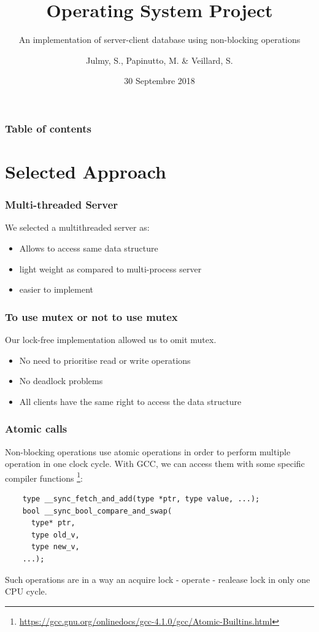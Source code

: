 \documentclass{bredelebeamer}
\title[OS Project]{Operating System Project}
\subtitle{An implementation of server-client database using non-blocking operations}
\author{Julmy, S., Papinutto, M. \& Veillard, S.}
\institute[UniFr]{University of Fribourg}
\date{30 Septembre 2018}
\begin{document}
\maketitle

\begin{frame}
  \frametitle{Table of contents}
  \tableofcontents
\end{frame}

\section{Selected Approach}

\begin{frame}
  \frametitle{Multi-threaded Server}
  We selected a multithreaded server as: \\
  \begin{itemize}
  \item Allows to access same data structure
  \item light weight as compared to multi-process server
  \item easier to implement
  \end{itemize}
\end{frame}

\begin{frame}
  \frametitle{To use mutex or not to use mutex}
  Our lock-free implementation allowed us to omit mutex.
  \begin{itemize}
  \item No need to prioritise read or write operations
  \item No deadlock problems
  \item All clients have the same right to access the data structure
  \end{itemize}
\end{frame}

\begin{frame}[fragile]
  \frametitle{Atomic calls}
  Non-blocking operations use atomic operations in order to perform multiple
  operation in one clock cycle. With GCC, we can access them with some
  specific compiler functions
  \footnote{\url{https://gcc.gnu.org/onlinedocs/gcc-4.1.0/gcc/Atomic-Builtins.html}}:
  
  \begin{verbatim}
    type __sync_fetch_and_add(type *ptr, type value, ...);
    bool __sync_bool_compare_and_swap(
      type* ptr,
      type old_v,
      type new_v,
    ...);
  \end{verbatim}

  Such operations are in a way an acquire lock - operate - realease lock in
  only one CPU cycle.
\end{frame}
\end{document}
